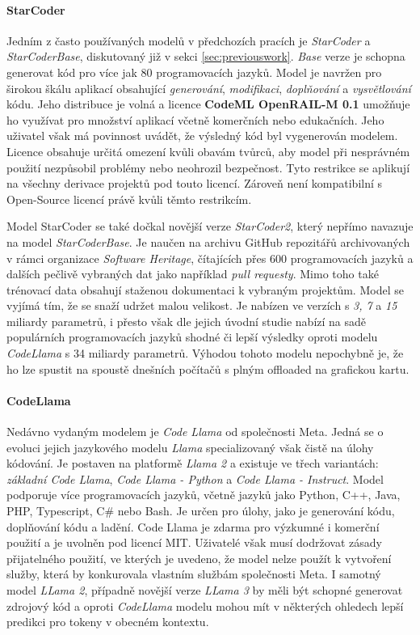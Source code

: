 \documentclass[czech, ma, kiv, he, iso690numb, pdf, viewonly]{fasthesis}
\begin{document}
    \paragraph{StarCoder} Jedním z často používaných modelů v předchozích pracích \cite{schafer2023empirical} je \textit{StarCoder} a \textit{StarCoderBase}, diskutovaný již v sekci \ref{sec:previouswork}. \textit{Base} verze je schopna generovat kód pro více jak 80 programovacích jazyků. Model je navržen pro širokou škálu aplikací obsahující \textit{generování}, \textit{modifikaci}, \textit{doplňování} a \textit{vysvětlování} kódu. Jeho distribuce je volná a licence \textbf{CodeML OpenRAIL-M 0.1} \cite{BigCode2023} umožňuje ho využívat pro množství aplikací včetně komerčních nebo edukačních. Jeho uživatel však má povinnost uvádět, že výsledný kód byl vygenerován modelem. Licence obsahuje určitá omezení kvůli obavám tvůrců, aby model při nesprávném použití nezpůsobil problémy nebo neohrozil bezpečnost. Tyto restrikce se aplikují na všechny derivace projektů pod touto licencí. Zároveň není kompatibilní s Open-Source licencí právě kvůli těmto restrikcím.

    Model StarCoder se také dočkal novější verze \textit{StarCoder2}, který nepřímo navazuje na model \textit{StarCoderBase}. Je naučen na archivu GitHub repozitářů archivovaných v rámci organizace \textit{Software Heritage}, čítajících přes 600 programovacích jazyků a dalších pečlivě vybraných dat jako například \textit{pull requesty}. Mimo toho také trénovací data obsahují staženou dokumentaci k vybraným projektům. Model se vyjímá tím, že se snaží udržet malou velikost. Je nabízen ve verzích s \textit{3, 7} a \textit{15} miliardy parametrů, i přesto však dle jejich úvodní studie \cite{starcoder2024} nabízí na sadě populárních programovacích jazyků shodné či lepší výsledky oproti modelu \textit{CodeLlama} s 34 miliardy parametrů. Výhodou tohoto modelu nepochybně je, že ho lze spustit na spoustě dnešních počítačů s plným offloaded na grafickou kartu.

    \paragraph{CodeLlama} Nedávno vydaným modelem je \textit{Code Llama} od společnosti Meta. Jedná se o evoluci jejich jazykového modelu \textit{Llama} specializovaný však čistě na úlohy kódování. Je postaven na platformě \textit{Llama 2} a existuje ve třech variantách: \textit{základní Code Llama}, \textit{Code Llama - Python} a \textit{Code Llama - Instruct}. Model podporuje více programovacích jazyků, včetně jazyků jako Python, C++, Java, PHP, Typescript, C# nebo Bash. Je určen pro úlohy, jako je generování kódu, doplňování kódu a ladění. Code Llama je zdarma pro výzkumné i komerční použití a je uvolněn pod licencí MIT. Uživatelé však musí dodržovat  zásady přijatelného použití, ve kterých je uvedeno, že model nelze použít k vytvoření služby, která by konkurovala vlastním službám společnosti Meta. \cite{roziere2024code} I samotný model \textit{LLama 2}, případně novější verze \textit{LLama 3} by měli být schopné generovat zdrojový kód a oproti \textit{CodeLlama} modelu mohou mít v některých ohledech lepší predikci pro tokeny v obecném kontextu. \cite{metallama3introduction}
\end{document}
